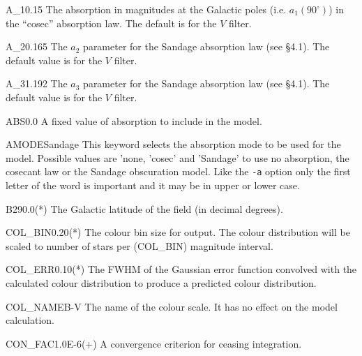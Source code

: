 \documentclass[11pt,twoside]{article}
\begin{document}
\begin{key}{A\_1}{0.15}{}
The absorption in magnitudes at the Galactic poles (i.e. $a_1(90^\circ)$) in 
the ``cosec'' absorption law. The default is for the $V$ filter.
\end{key}

\begin{key}{A\_2}{0.165}{}
The $a_2$ parameter for the Sandage absorption law (see \S 4.1). The default 
value is for the $V$ filter.
\end{key}

\begin{key}{A\_3}{1.192}{}
The $a_3$ parameter for the Sandage absorption law (see \S 4.1). The default 
value is for the $V$ filter.
\end{key}

\begin{key}{ABS}{0.0}{}
A fixed value of absorption to include in the model.
\end{key}

\begin{key}{AMODE}{Sandage}{}
This keyword selects the absorption mode to be used for the model. Possible 
values are 'none, 'cosec' and 'Sandage' to use no absorption,
the cosecant law or the Sandage obscuration model. Like the {\tt -a} option
only the first letter of the word is important and it may be in upper or
lower case.
\end{key}

\begin{key}{B2}{90.0}{(*)}
The Galactic latitude of the field (in decimal degrees).
\end{key}

\begin{key}{COL\_BIN}{0.20}{(*)}
The colour bin size for output. The colour distribution will be scaled to 
number of stars per (COL\_BIN) magnitude interval.
\end{key}

\begin{key}{COL\_ERR}{0.10}{(*)}
The FWHM of the Gaussian error function convolved with the 
calculated colour distribution to produce a predicted colour distribution.
\end{key}

\begin{key}{COL\_NAME}{B-V}{}
The name of the colour scale. It has no effect on the model calculation.
\end{key}

\begin{key}{CON\_FAC}{1.0E-6}{(+)}
A convergence criterion for ceasing integration.
\end{key}
\end{document}
